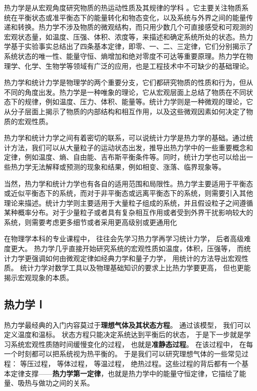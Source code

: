 
\begin{issues}
\issueDraft
\end{issues}

热力学是从宏观角度研究物质的热运动性质及其规律的学科 。它主要关注物质系统在平衡状态或准平衡态下的能量转化和物态变化，以及系统与外界之间的能量传递和转换。热力学不涉及物质的微观结构，而只用少数几个可直接感受和可观测的宏观状态量，如温度、压强、体积、浓度等，来描述和确定系统所处的状态。热力学基于实验事实总结出了四条基本定律，即零、一、二、三定律，它们分别揭示了系统状态的唯一性、能量守恒、熵增加和绝对零度不可达等重要原理。热力学在物理学、化学、生物学等领域有广泛的应用，也是工程技术中不可缺少的基础理论。

热力学和统计力学是物理学的两个重要分支，它们都研究物质的性质和行为，但从不同的角度出发。热力学是一种唯象的理论，它从宏观层面上总结了物质在不同状态下的规律，例如温度、压力、体积、能量等。统计力学则是一种微观的理论，它从分子层面上揭示了物质的内部结构和相互作用，以及这些微观因素如何决定了物质的宏观性质。

热力学和统计力学之间有着密切的联系，可以说统计力学是热力学的基础。通过统计方法，我们可以从大量粒子的运动状态出发，推导出热力学中的一些重要概念和定律，例如温度、熵、自由能、吉布斯平衡条件等。同时，统计力学也可以给出一些热力学无法解释或预测的现象和结果，例如相变、涨落、临界现象等。

当然，热力学和统计力学也有各自的适用范围和局限性。热力学主要适用于平衡态或近似平衡态下的系统，而对于非平衡态或远离平衡态下的系统，则需要引入其他理论来描述。统计力学则主要适用于大量粒子组成的系统，并且假设粒子之间遵循某种概率分布。对于少量粒子或者具有复杂相互作用或者受到外界干扰影响较大的系统，则需要考虑更多细节或者采用更高级别或更通用化




在物理学本科的专业课程中， 往往会先学习热力学再学习统计力学， 后者高级难度更大。 热力学几乎直接开始研究系统的宏观性质如温度，体积，压强等， 而统计力学更强调如何由微观定律如经典力学和量子力学， 用统计的方法导出宏观性质。 统计力学对数学工具以及物理基础知识的要求上比热力学要更高， 但也更能揭示宏观现象的本质。

\subsection{热力学 Ⅰ}
热力学最经典的入门内容莫过于\textbf{理想气体及其状态方程}。 通过该模型， 我们可以定义温度和温标。 状态方程只能决定系统达到平衡后的状态， 于是下一步就是学习系统宏观性质随时间缓慢变化的过程， 也就是\textbf{准静态过程}。 在该过程中， 在每一个时刻都可以把系统视为热平衡的。 于是我们可以研究理想气体的一些常见过程： 等压过程， 等体过程， 等温过程， 绝热过程。这些过程的背后都有一个基本定律支撑——\textbf{热力学第一定律}，也就是热力学中的能量守恒定律，它描绘了能量、吸热与做功之间的关系。

